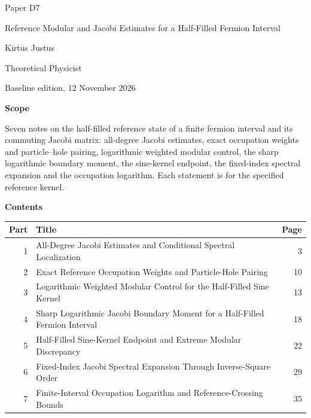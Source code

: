 \documentclass[11pt,a4paper]{article}
\begin{document}
\thispagestyle{empty}\pagestyle{empty}
{\small\sffamily \ProgramTitle\hfill Paper D7\par}
\vspace*{12mm}
{\LARGE\bfseries\raggedright{} Reference Modular and Jacobi Estimates for a Half-Filled Fermion Interval\par}
\vspace{9mm}
{\large Kirtus Justus\par}\vspace{1mm}Theoretical Physicist\par\AuthorLocation\par\vspace{2mm}Baseline edition, 12 November 2026\par\vspace{8mm}
\textbf{Scope}\par
Seven notes on the half-filled reference state of a finite fermion interval and its commuting Jacobi matrix: all-degree Jacobi estimates, exact occupation weights and particle–hole pairing, logarithmic weighted modular control, the sharp logarithmic boundary moment, the sine-kernel endpoint, the fixed-index spectral expansion and the occupation logarithm. Each statement is for the specified reference kernel.\par\vspace{5mm}
\textbf{Contents}\par\vspace{1mm}
{\small\begin{longtable}{@{}r>{\raggedright\arraybackslash}p{}r@{}}
\toprule Part & Title & Page\\\midrule\endhead
1 & All-Degree Jacobi Estimates and Conditional Spectral Localization & 3\\
2 & Exact Reference Occupation Weights and Particle-Hole Pairing & 10\\
3 & Logarithmic Weighted Modular Control for the Half-Filled Sine Kernel & 13\\
4 & Sharp Logarithmic Jacobi Boundary Moment for a Half-Filled Fermion Interval & 18\\
5 & Half-Filled Sine-Kernel Endpoint and Extreme Modular Discrepancy & 22\\
6 & Fixed-Index Jacobi Spectral Expansion Through Inverse-Square Order & 29\\
7 & Finite-Interval Occupation Logarithm and Reference-Crossing Bounds & 35\\
\bottomrule\end{longtable}}
\end{document}

